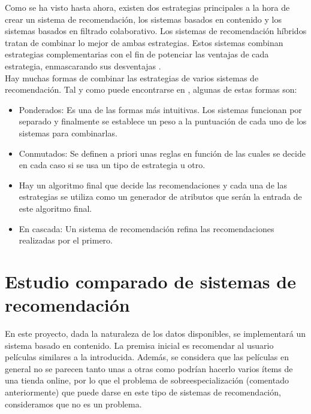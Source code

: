 Como se ha visto hasta ahora, existen dos estrategias principales a la hora de crear un sistema de recomendación, los sistemas basados en contenido y los sistemas basados en filtrado colaborativo. Los sistemas de recomendación híbridos tratan de combinar lo mejor de ambas estrategias. Estos sistemas combinan estrategias complementarias con el fin de potenciar las ventajas de cada estrategia, enmascarando sus desventajas \cite{CanoMorisio2017}.\\

Hay muchas formas de combinar las estrategias de varios sistemas de recomendación. Tal y como puede encontrarse en \cite{Burke2002}, algunas de estas formas son:

\begin{itemize}
    \item Ponderados: Es una de las formas más intuitivas. Los sistemas funcionan por separado y finalmente se establece un peso a la puntuación de cada uno de los sistemas para combinarlas.
    \item Conmutados: Se definen a priori unas reglas en función de las cuales se decide en cada caso si se usa un tipo de estrategia u otro.
    \item Hay un algoritmo final que decide las recomendaciones y cada una de las estrategias se utiliza como un generador de atributos que serán la entrada de este algoritmo final.
    \item En cascada: Un sistema de recomendación refina las recomendaciones realizadas por el primero.
\end{itemize}

\section{Estudio comparado de sistemas de recomendación}


En este proyecto, dada la naturaleza de los datos disponibles, se implementará un sistema basado en contenido. La premisa inicial es recomendar al usuario películas similares a la introducida. Además, se considera que las películas en general no se parecen tanto unas a otras como podrían hacerlo varios ítems de una tienda online, por lo que el problema de sobreespecialización (comentado anteriormente) que puede darse en este tipo de sistemas de recomendación, consideramos que no es un problema.\\

